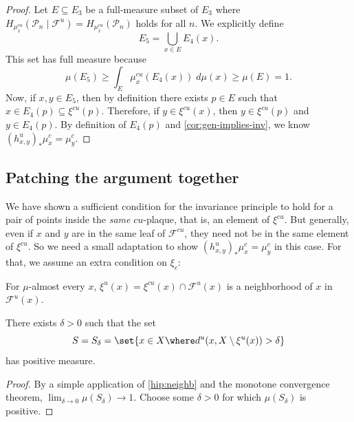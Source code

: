 \documentclass[../main]{subfiles}
\begin{document}
\begin{proof}
  Let \(E \subseteq E_3\) be a full-measure subset of \(E_3\) where \(H_{\mu_x^{cu}}(\mathcal{P}_n\mid \mathcal{F}^u) = H_{\mu_x^{cu}}(\mathcal{P}_n)\) holds for all \(n\). We explicitly define
  \begin{equation*}
    E_5 = \bigcup_{x \in E}E_4(x).
  \end{equation*}
  This set has full measure because
  \begin{equation*}
    \mu(E_5) \ge \int_{E} \mu^{cu}_x(E_4(x)) \;d\mu(x) \ge \mu(E) = 1.
  \end{equation*}
  Now, if \(x,y \in E_5\), then by definition there exists \(p \in E\) such that \(x \in E_4(p) \subseteq \xi^{cu}(p)\). Therefore, if \(y \in \xi^{cu}(x)\), then \(y \in \xi^{cu}(p)\) and \(y \in E_4(p)\). By definition of \(E_4(p)\) and \cref{cor:gen-implies-inv}, we know \((h^u_{x,y})_*\mu^c_x = \mu^c_y\).
\end{proof}

\subsection{Patching the argument together}

We have shown a sufficient condition for the invariance principle to hold for a pair of points inside the \emph{same} \(cu\)-plaque, that is, an element of \(\xi^{cu}\). But generally, even if \(x\) and \(y\) are in the same leaf of \(\mathcal{F}^{cu}\), they need not be in the same element of \(\xi^{cu}\). So we need a small adaptation to show \((h^u_{x,y})_*\mu^c_x = \mu^c_y\) in this case. For that, we assume an extra condition on \(\xi_c\):

\begin{hypothesis}\label{hip:neighb}
  For \(\mu\)-almost every \(x\), \(\xi^u(x) = \xi^{cu}(x) \cap \mathcal{F}^u(x)\) is a neighborhood of \(x\) in \(\mathcal{F}^u(x)\).
\end{hypothesis}

\begin{lemma}
  There exists \(\delta > 0\) such that the set
  \begin{equation*}
    S = S_{\delta} = \set{x \in X \where d^u(x, X \setminus \xi^{u}(x)) > \delta}
  \end{equation*}
  has positive measure.
\end{lemma}
\begin{proof}
  By a simple application of \cref{hip:neighb} and the monotone convergence theorem, \(\lim_{\delta \to 0}      \mu(S_{\delta})\to 1\). Choose some \(\delta > 0\) for which \(\mu(S_{\delta})\) is positive.
\end{proof}
\end{document}
